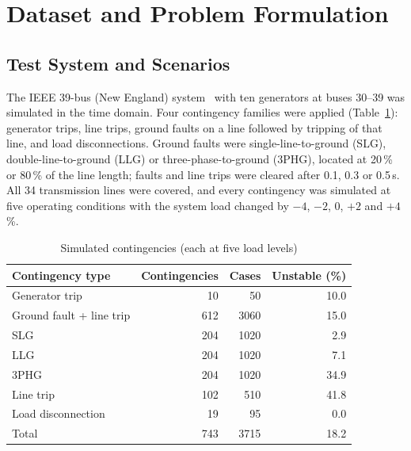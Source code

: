 \documentclass[conference]{IEEEtran}
\begin{document}
\section{Dataset and Problem Formulation}
\label{sec:data}
\subsection{Test System and Scenarios}
The IEEE 39-bus (New England) system~\cite{athay1979} with ten generators at buses 30--39 was simulated in the time
domain. %
Four contingency families were applied (Table~\ref{tab:scenarios}): generator trips, line trips, ground faults on a
line followed by tripping of that line, and load disconnections. Ground faults were single-line-to-ground (SLG),
double-line-to-ground (LLG) or three-phase-to-ground (3PHG), located at 20\,\% or 80\,\% of the line length; faults and
line trips were cleared after 0.1, 0.3 or 0.5\,s. All 34 transmission lines were covered, and every contingency was
simulated at five operating conditions with the system load changed by $-4$, $-2$, 0, $+2$ and $+4$\,\%.

\begin{table}[t]
\caption{Simulated contingencies (each at five load levels)}
\label{tab:scenarios}
\centering
\begin{tabular}{lrrr}
\toprule
Contingency type & Contingencies & Cases & Unstable (\%) \\
\midrule
Generator trip           & 10  & 50   & 10.0 \\
Ground fault + line trip & 612 & 3060 & 15.0 \\
\quad SLG                & 204 & 1020 & 2.9 \\
\quad LLG                & 204 & 1020 & 7.1 \\
\quad 3PHG               & 204 & 1020 & 34.9 \\
Line trip                & 102 & 510  & 41.8 \\
Load disconnection       & 19  & 95   & 0.0 \\
\midrule
Total                    & 743 & 3715 & 18.2 \\
\bottomrule
\end{tabular}
\end{table}
\end{document}
